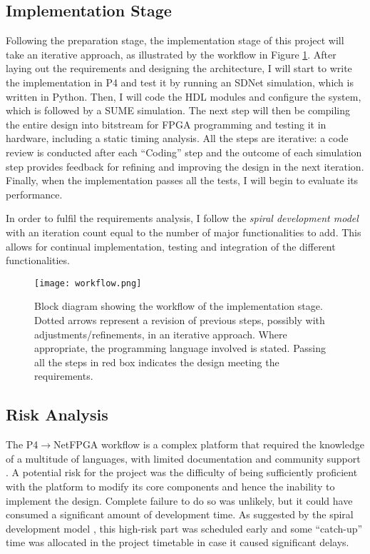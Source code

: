 \subsection{Implementation Stage}
Following the preparation stage, the implementation stage of this project will take an iterative approach, as illustrated by the workflow in Figure \ref{fig:workflow}. After laying out the requirements and designing the architecture, I will start to write the implementation in P4 and test it by running an SDNet simulation, which is written in Python. Then, I will code the HDL modules and configure the system, which is followed by a SUME simulation. The next step will then be compiling the entire design into bitstream for FPGA programming and testing it in hardware, including a static timing analysis. All the steps are iterative: a code review is conducted after each ``Coding'' step and the outcome of each simulation step provides feedback for refining and improving the design in the next iteration. Finally, when the implementation passes all the tests, I will begin to evaluate its performance.

In order to fulfil the requirements analysis, I follow the \textit{spiral development model} \cite{spiral} with an iteration count equal to the number of major functionalities to add. This allows for continual implementation, testing and integration of the different functionalities.

\begin{figure}[!ht]
	\centering
	\texttt{[image: workflow.png]}
	\caption{Block diagram showing the workflow of the implementation stage. Dotted arrows represent a revision of previous steps, possibly with adjustments/refinements, in an iterative approach. Where appropriate, the programming language involved is stated. Passing all the steps in red box indicates the design meeting the requirements.}
	\label{fig:workflow}
\end{figure}

\subsection{Risk Analysis}
The P4$\rightarrow$NetFPGA workflow is a complex platform that required the knowledge of a multitude of languages, with limited documentation \cite{fpga} and community support \cite{support}. A potential risk for the project was the difficulty of being sufficiently proficient with the platform to modify its core components and hence the inability to implement the design. Complete failure to do so was unlikely, but it could have consumed a significant amount of development time. As suggested by the spiral development model \cite{spiral}, this high-risk part was scheduled early and some “catch-up” time was allocated in the project timetable in case it caused significant delays.

